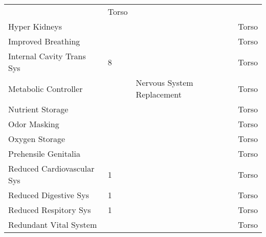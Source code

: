 \documentclass[twoside]{book}
\begin{document}
\begin{longtable}{p{1.25in}p{2em}ll}
  &
   Torso 
  \tabularnewline
      
  \raggedright
           Hyper Kidneys 
  &
  
  &
  
  &
   Torso 
  \tabularnewline
      
  \raggedright
           Improved Breathing 
  &
  
  &
  
  &
   Torso 
  \tabularnewline
      
  \raggedright
           Internal Cavity Trans Sys
           
  &
   8 
  &
  
  &
   Torso 
  \tabularnewline
      
  \raggedright
           Metabolic Controller 
  &
  
  &
   Nervous System
           Replacement 
  &
   Torso 
  \tabularnewline
      
  \raggedright
           Nutrient Storage 
  &
  
  &
  
  &
   Torso 
  \tabularnewline
      
  \raggedright
           Odor Masking 
  &
  
  &
  
  &
   Torso 
  \tabularnewline
      
  \raggedright
           Oxygen Storage 
  &
  
  &
  
  &
   Torso 
  \tabularnewline
      
  \raggedright
           Prehensile Genitalia 
  &
  
  &
  
  &
   Torso 
  \tabularnewline
      
  \raggedright
           Reduced Cardiovascular Sys
           
  &
   1 
  &
  
  &
   Torso 
  \tabularnewline
      
  \raggedright
           Reduced Digestive Sys 
  &
   1 
  &
  
  &
   Torso 
  \tabularnewline
      
  \raggedright
           Reduced Respitory Sys 
  &
   1 
  &
  
  &
   Torso 
  \tabularnewline
      
  \raggedright
           Redundant Vital System 
  &
  
  &
  
  &
   Torso 
  \tabularnewline
      

\end{longtable}
\end{document}

